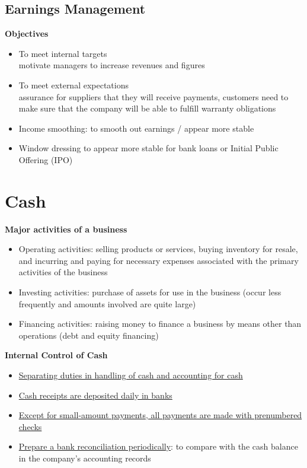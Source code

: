 \documentclass{article}
\begin{document}
\begin{multicols}{2}
\subsection{Earnings Management}
\textbf{Objectives}
\begin{itemize}
	\item To meet internal targets\\
	motivate managers to increase revenues and figures
	\item To meet external expectations\\
	assurance for suppliers that they will receive payments, customers need to make sure that the company will be able to fulfill warranty obligations
	\item Income smoothing: to smooth out earnings / appear more stable
	\item Window dressing to appear more stable for bank loans or Initial Public Offering (IPO)
\end{itemize}

\section{Cash}
\textbf{Major activities of a business}
\begin{itemize}
	\item Operating activities: selling products or services, buying inventory for resale, and incurring and paying for necessary expenses associated with the primary activities of the business
	\item Investing activities: purchase of assets for use in the business (occur less frequently and amounts involved are quite large)
	\item Financing activities: raising money to finance a business by means other than operations (debt and equity financing)
\end{itemize}
\textbf{Internal Control of Cash}
\begin{itemize}
	\item \underline{Separating duties in handling of cash and accounting for cash}
	\item \underline{Cash receipts are deposited daily in banks}
	\item \underline{Except for small-amount payments, all payments are made with prenumbered checks}
	\item \underline{Prepare a bank reconciliation periodically}: to compare with the cash balance in the company's accounting records
\end{itemize}


\end{multicols}
\end{document}
